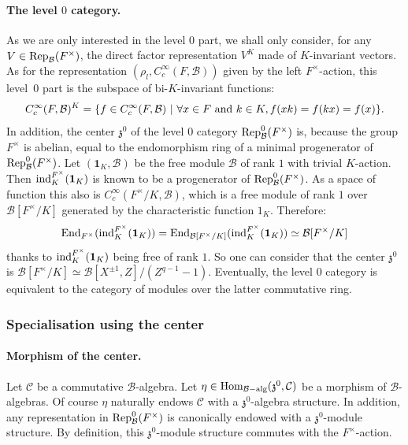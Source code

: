 \documentclass[11pt]{article}
\theoremstyle{plain}
\theoremstyle{definition}
\theoremstyle{plain}
\theoremstyle{definition}
\theoremstyle{plain}
\begin{document}
\paragraph{The level $0$ category.} As we are only interested in the level $0$ part, we shall only consider, for any $V \in \textup{Rep}_\mathcal{B}(F^\times)$, the direct factor representation $V^K$ made of $K$-invariant vectors. As for the representation $(\rho_l,C_c^\infty(F,\mathcal{B}))$ given by the left $F^\times$-action, this level~$0$ part is the subspace of bi-$K$-invariant functions:
$$C_c^\infty(F,\mathcal{B})^K = \{ f \in C_c^\infty(F,\mathcal{B}) \ | \ \forall x \in F \textup{ and } k \in K, f(xk)=f(kx)=f(x)\}.$$
In addition, the center $\mathfrak{z}^0$ of the level $0$ category $\textup{Rep}_\mathcal{B}^0(F^\times)$ is, because the group $F^\times$ is abelian, equal to the endomorphism ring of a minimal progenerator of $\textup{Rep}_\mathcal{B}^0(F^\times)$. Let $(\textbf{1}_K,\mathcal{B})$ be the free module $\mathcal{B}$ of rank $1$ with trivial $K$-action. Then $\textup{ind}_K^{F^\times} (\textbf{1}_K)$ is known to be a progenerator of $\textup{Rep}_\mathcal{B}^0(F^\times)$. As a space of function this also is $C_c^\infty(F^\times/K,\mathcal{B})$, which is a free module of rank $1$ over $\mathcal{B}[F^\times/K]$ generated by the characteristic function $1_K$. Therefore: 
$$\textup{End}_{F^\times}(\textup{ind}_K^{F^\times} (\textbf{1}_K) )=  \textup{End}_{\mathcal{B}[F^\times/K]}(\textup{ind}_K^{F^\times} (\textbf{1}_K)) \simeq \mathcal{B}[F^\times/K]$$
thanks to $\textup{ind}_K^{F^\times}(\textbf{1}_K)$ being free of rank $1$. So one can consider that the center $\mathfrak{z}^0$ is $\mathcal{B}[F^\times/K] \simeq \mathcal{B}[X^{\pm 1},Z]/(Z^{q-1}-1)$. Eventually, the level $0$ category is equivalent to the category of modules over the latter commutative ring.

\subsubsection{Specialisation using the center} \label{specialisation_using_the_center_section}

\paragraph{Morphism of the center.} Let $\mathcal{C}$ be a commutative $\mathcal{B}$-algebra. Let $\eta \in \textup{Hom}_{\mathcal{B}-\textup{alg}}(\mathfrak{z}^0,\mathcal{C})$ be a morphism of $\mathcal{B}$-algebras. Of course $\eta$ naturally endows $\mathcal{C}$ with a $\mathfrak{z}^0$-algebra structure. In addition, any representation in $\textup{Rep}_\mathcal{B}^0(F^\times)$ is canonically endowed with a $\mathfrak{z}^0$-module structure. By definition, this $\mathfrak{z}^0$-module structure commutes with the $F^\times$-action.
\end{document}
